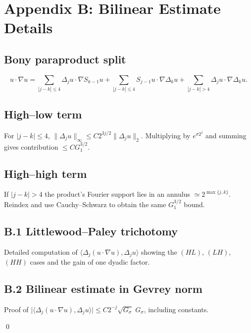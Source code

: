 \section{Appendix B: Bilinear Estimate Details}\label{NS:appendix-bilinear}

\subsection{Bony paraproduct split}
\[
u\!\cdot\!\nabla u
  =\!\!\sum_{|j-k|\le4}\!\!
     \Delta_{j}u\cdot\nabla S_{k-1}u
   +\!\!\sum_{|j-k|\le4}\!\!
     S_{j-1}u\cdot\nabla\Delta_{k}u
   +\!\!\sum_{|j-k|>4}\!\!
     \Delta_{j}u\cdot\nabla\Delta_{k}u.
\]

\subsection{High–low term}
For $|j-k|\le4$,
\(
\|\Delta_{j}u\|_{\infty}\le C 2^{3j/2}\|\Delta_{j}u\|_{2}.
\)
Multiplying by $e^{\sigma 2^{j}}$ and summing gives contribution
\(\le C G_{1}^{3/2}\).

\subsection{High–high term}
If $|j-k|>4$ the product's Fourier support lies in an annulus
$\simeq2^{\max\{j,k\}}$.  Reindex and use Cauchy–Schwarz to obtain the
same $G_{1}^{3/2}$ bound.

\subsection*{B.1 Littlewood--Paley trichotomy}
Detailed computation of $\langle\Delta_j(u\!\cdot\!\nabla u),\Delta_j u\rangle$
showing the $(HL)$, $(LH)$, $(HH)$ cases and the gain of one dyadic
factor.

\subsection*{B.2 Bilinear estimate in Gevrey norm}
Proof of
$\bigl|\langle\Delta_j(u\!\cdot\!\nabla u),\Delta_j u\rangle\bigr|
 \le C2^{-j}\sqrt{G_\sigma}\;G_\sigma$,
including constants.

\qed 
